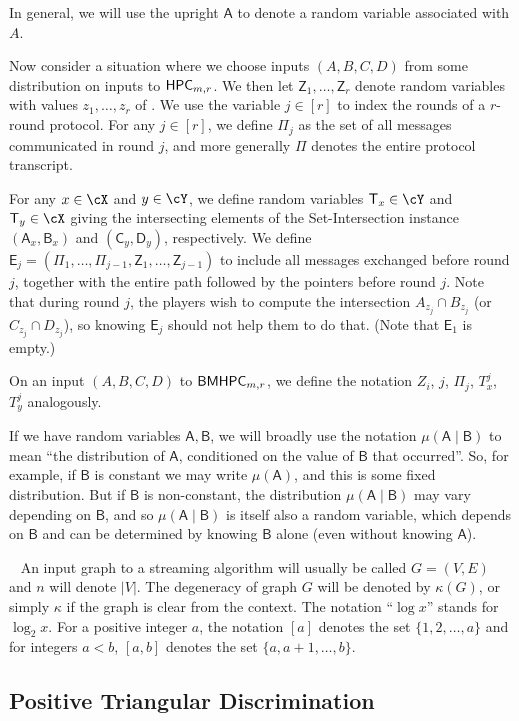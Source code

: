 \documentclass[11pt,letterpaper]{article}
\theoremstyle{definition}
\newcommand{\rPi}{\rv{\Pi}}
\newcommand{\bmhpc}{\ensuremath{\textnormal{\textsf{BMHPC}}}\xspace}
\newcommand{\hpc}{\ensuremath{\textnormal{\textsf{HPC}}}\xspace}
\newcommand{\mypar}[1]{\smallskip\noindent{\sffamily\bfseries #1.}~}
\newcommand{\Prot}{\ensuremath{\Pi}}
\newcommand{\rA}{\rv{A}}
\newcommand{\rB}{\rv{B}}
\newcommand{\rC}{\rv{C}}
\newcommand{\rD}{\rv{D}}
\newcommand{\rv}[1]{\ensuremath{\mathsf{#1}}}
\newcommand{\rZ}{\rv{Z}}
\newcommand{\rT}{\rv{T}}
\newcommand{\rE}{\rv{E}}
\begin{document}
In general, we will use the upright $\rA$ to denote a random variable
associated with $A$.

Now consider a situation where we choose inputs $(A, B, C, D)$ from some
distribution on inputs to $\hpc_{m,r}$.
We then let $\rZ_1, \ldots , \rZ_r$ denote random variables with values
$z_1, \ldots, z_r$ of .
We use the variable $j \in [r]$ to index the rounds of a
$r$-round protocol.
For any $j \in [r]$, we define $\Prot_j$ as the set of all messages
communicated in round $j$, and more generally $\Prot$ denotes the entire
protocol transcript. 

For any $x \in \cX$ and $y \in \cY$, we define random variables
$\rT_x \in \cY$ and $\rT_y \in \cX$ giving the intersecting elements of the
Set-Intersection instance $(\rA_x, \rB_x)$ and $(\rC_y, \rD_y)$, respectively.
We define $\rE_j = (\rPi_1, \ldots, \rPi_{j-1}, \rZ_1, \ldots, \rZ_{j-1})$ to
include all messages exchanged before round $j$, together with the entire path
followed by the pointers before round $j$.
Note that during round $j$, the players wish to compute the intersection
$A_{z_j} \cap B_{z_j}$ (or $C_{z_j} \cap D_{z_j}$), so knowing $\rE_j$ should
not help them to do that. (Note that $\rE_1$ is empty.)

On an input $(A, B, C, D)$ to $\bmhpc_{m,r}$, we define the notation
$Z_i$, $j$, $\Prot_j$, $T^j_x$, $T^j_y$ analogously.

If we have random variables $\rA, \rB$, we will broadly use the notation
$\mu(\rA \mid \rB)$ to mean ``the distribution of $\rA$, conditioned on the
value of $\rB$ that occurred''.
So, for example, if $\rB$ is constant we may write $\mu(\rA)$, and this
is some fixed distribution.
But if $\rB$ is non-constant, the distribution $\mu(\rA \mid \rB)$ may vary
depending on $\rB$, and so $\mu(\rA \mid \rB)$ is itself also a random
variable, which depends on $\rB$ and can be determined by knowing $\rB$ alone
(even without knowing $\rA$).

\mypar{Other notation}
An input graph to a streaming algorithm will usually be called $G=(V,E)$ and $n$ will denote $|V|$. The degeneracy of graph $G$ will be denoted by $\kappa(G)$, or simply $\kappa$ if the graph is clear from the context. The notation ``$\log x$'' stands for $\log_2 x$. For a positive integer $a$, the notation $[a]$ denotes the set $\{1,2,\ldots,a\}$ and for integers $a<b$, $[a,b]$ denotes the set $\{a,a+1,\ldots,b\}$.
 


\subsection{Positive Triangular Discrimination} \label{sec:td}
\end{document}
